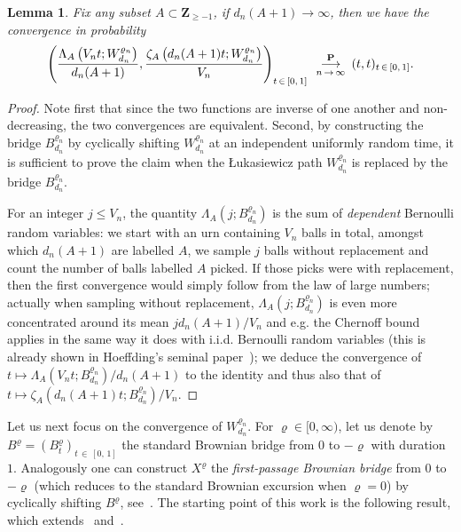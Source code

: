 \documentclass[10pt]{amsart}
\newtheorem{lemm}[theo]{Lemma}\newtheorem{prop}[theo]{Proposition}\newtheorem{coro}[theo]{Corollary}\newtheorem{conj}[theo]{Conjecture}
\theoremstyle{definition}\newtheorem{defi}[theo]{Definition}\newtheorem{rema}[theo]{Remark}\newtheorem{exam}[theo]{Example}\newtheorem{exem}[theo]{Example}\newtheorem{nota}[theo]{Notation}
\newcommand{\ensembles}[1]{\mathbf{#1}}
\newcommand{\Z}{\ensembles{Z}}
\renewcommand{\P}{\ensembles{P}}
\newcommand{\1}{\ensembles{1}}
\renewcommand{\le}{\leqslant}
\renewcommand{\ge}{\geqslant}
\newcommand{\Wfn}{W_{d_n}^{\varrho_n}}
\newcommand{\Bfn}{B_{d_n}^{\varrho_n}}
\newcommand{\vertices}{V}
\newcommand{\cvproba}[1][n]{\enskip\mathop{\longrightarrow}^{\P}_{#1\,\to\, \infty}\enskip}
\providecommand{\?}{}
\begin{document}
\begin{lemm}\label{lem:proportion_feuilles}
Fix any subset $A \subset \Z_{\ge -1}$, if $d_n(A+1) \to \infty$, then we have the convergence in probability
\[
\left(\frac{\Lambda_A\left(\vertices_n t; \Wfn\right)}{d_n(A+1)}, \frac{\zeta_A\left(d_n(A+1) t; \Wfn\right)}{\vertices_n}\right)_{t\,\in\,[0,\,1]} \cvproba (t, t)_{t \,\in\,[0,\,1]}.
\]
\end{lemm}

\begin{proof}
Note first that since the two functions are inverse of one another and non-decreasing, the two convergences are equivalent. Second, by constructing the bridge $\Bfn$ by cyclically shifting $\Wfn$ at an independent uniformly random time, it is sufficient to prove the claim when the {\L}ukasiewicz path $\Wfn$ is replaced by the bridge $\Bfn$.

For an integer $j \le V_n$, the quantity $\Lambda_A(j; \Bfn)$ is the sum of \emph{dependent} Bernoulli random variables: we start with an urn containing $\vertices_n$ balls in total, amongst which $d_n(A+1)$ are labelled $A$, we sample $j$ balls without replacement and count the number of balls labelled $A$ picked. If those picks were with replacement, then the first convergence would simply follow from the law of large numbers; actually when sampling without replacement, $\Lambda_A(j; \Bfn)$ is even more concentrated around its mean $j d_n(A+1)/\vertices_n$ and e.g. the Chernoff bound applies in the same way it does with i.i.d. Bernoulli random variables (this is already shown in Hoeffding’s seminal paper~\cite{Hoe63}); we deduce the convergence of $t \mapsto \Lambda_A(\vertices_n t; \Bfn) / d_n(A+1)$ to the identity and thus also that of $t \mapsto \zeta_A(d_n(A+1) t; \Bfn)/\vertices_n$.
\end{proof}


Let us next focus on the convergence of $\Wfn$. For $\varrho \in [0,\infty)$, let us denote by $B^\varrho = (B^\varrho_t)_{t\,\in\, [0,\,1]}$ the standard Brownian bridge from $0$ to $-\varrho$ with duration $1$. Analogously one can construct $X^\varrho$ the \emph{first-passage Brownian bridge} from $0$ to $-\varrho$ (which reduces to the standard Brownian excursion when $\varrho = 0$) by cyclically shifting $B^\varrho$, see~\cite[Theorem~7]{BCP03}. The starting point of this work is the following result, which extends~\cite[Lemma~7]{BM14} and~\cite[Theorem~1.6]{Lei19}.
\end{document}
